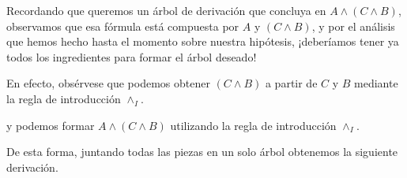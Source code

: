\documentclass{article}
\begin{document}
\begin{example}
    Recordando que queremos un árbol de derivación que concluya en
    $A \land (C \land B)$, observamos que esa fórmula está compuesta por $A$ y $(C \land B)$, y por el análisis que hemos hecho hasta el momento sobre nuestra hipótesis, ¡deberíamos tener ya todos los ingredientes para formar el árbol deseado!

    En efecto, obsérvese que podemos obtener $(C \land B)$ a partir de $C$ y $B$ mediante la regla de introducción $\land_I$.

        \begin{prooftree}
        \end{prooftree}
    
    y podemos formar $A \land (C \land B)$ utilizando la regla de introducción $\land_I$.

        \begin{prooftree}
        \end{prooftree}
    
    De esta forma, juntando todas las piezas en un solo árbol obtenemos la siguiente derivación.

        \begin{prooftree}
        \end{prooftree}
\end{example}
\end{document}
